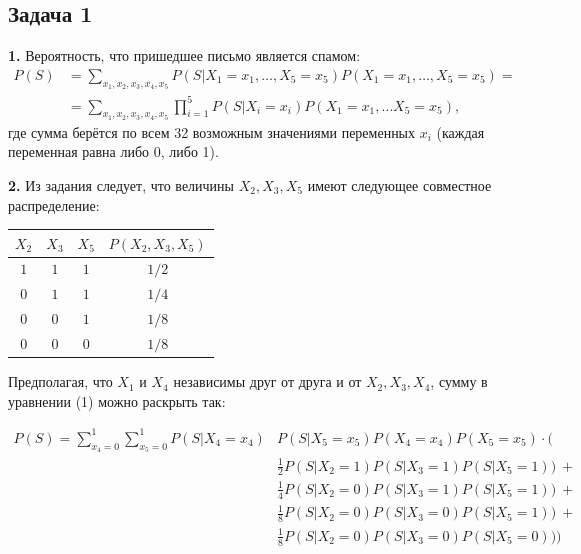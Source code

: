 \documentclass[a4paper, 12pt, onepage]{article}
\begin{document}
\author{Красильников Иван}
\title{}
\maketitle

\subsection*{Задача 1}
\textbf{1.} Вероятность, что пришедшее письмо является спамом:
\begin{align}
  P(S) &= \sum_{x_1, x_2, x_3, x_4, x_5} P(S | X_1=x_1, \ldots, X_5=x_5) P(X_1=x_1, \ldots, X_5=x_5) = \\
       &= \sum_{x_1, x_2, x_3, x_4, x_5} \prod_{i=1}^5 P(S | X_i=x_i) P(X_1=x_1, \ldots X_5=x_5),
\end{align}
где сумма берётся по всем 32 возможным значениями переменных $x_i$ (каждая переменная равна либо 0, либо 1).

\medskip

\textbf{2.} Из задания следует, что величины $X_2, X_3, X_5$ имеют следующее совместное распределение:

\medskip

\begin{tabular}{|c|c|c|c|}
  \hline
  $X_2$ & $X_3$ & $X_5$ & $P(X_2, X_3, X_5)$ \\
  \hline
  $1$ & $1$ & $1$ & ${1/2}$ \\
  $0$ & $1$ & $1$ & ${1/4}$ \\
  $0$ & $0$ & $1$ & ${1/8}$ \\
  $0$ & $0$ & $0$ & ${1/8}$ \\
  \hline
\end{tabular}

\medskip

Предполагая, что $X_1$ и $X_4$ независимы друг от друга и от $X_2, X_3, X_4$, сумму в уравнении (1) можно раскрыть так:

\begin{align*}
  P(S) = \sum_{x_4=0}^1 \sum_{x_5=0}^1 P(S|X_4=x_4) & P(S|X_5=x_5) P(X_4=x_4) P(X_5=x_5) \cdot (  \\
    & \frac{1}{2} P(S | X_2=1) P(S | X_3=1) P(S | X_5=1))\ + \\
    & \frac{1}{4} P(S | X_2=0) P(S | X_3=1) P(S | X_5=1))\ + \\
    & \frac{1}{8} P(S | X_2=0) P(S | X_3=0) P(S | X_5=1))\ + \\
    & \frac{1}{8} P(S | X_2=0) P(S | X_3=0) P(S | X_5=0)))
\end{align*}
\end{document}
